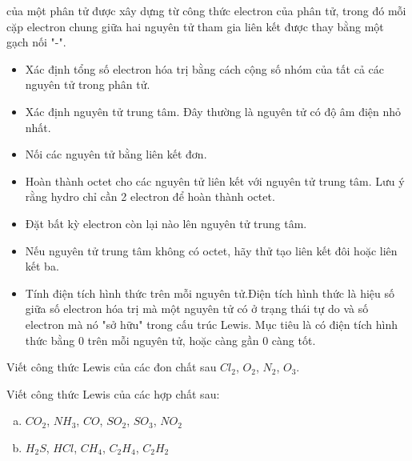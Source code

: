 \documentclass[Main_ver2.tex]{subfiles}
\gdef\key{}
\begin{document}
		\begin{hopdongian}
			 của một phân tử được xây dựng từ công thức electron của phân tử, trong đó mỗi cặp electron chung giữa hai nguyên tử tham gia liên kết được thay bằng một gạch nối "-".
		\end{hopdongian}
	\begin{phuongphap}
		\begin{itemize}
				\item  {} Xác định tổng số electron hóa trị bằng cách cộng số nhóm của tất cả các nguyên tử trong phân tử.
				\item  {} Xác định nguyên tử trung tâm. Đây thường là nguyên tử có độ âm điện nhỏ nhất.
				\item  {} Nối các nguyên tử bằng liên kết đơn.
				\item  {} Hoàn thành octet cho các nguyên tử liên kết với nguyên tử trung tâm. Lưu ý rằng hydro chỉ cần 2 electron để hoàn thành octet.
				\item  {} Đặt bất kỳ electron còn lại nào lên nguyên tử trung tâm.
				\item  {} Nếu nguyên tử trung tâm không có octet, hãy thử tạo liên kết đôi hoặc liên kết ba.
				\item  {} Tính điện tích hình thức trên mỗi nguyên tử.Điện tích hình thức là hiệu số giữa số electron hóa trị mà một nguyên tử có ở trạng thái tự do và số electron mà nó "sở hữu" trong cấu trúc Lewis. Mục tiêu là có điện tích hình thức bằng 0 trên mỗi nguyên tử, hoặc càng gần 0 càng tốt.
		\end{itemize}
	\end{phuongphap}
	\gdef\key{Lời giải:}
	\begin{vd}
		Viết công thức Lewis của các đon chất sau $Cl_2$, $O_2$, $N_2$, $O_3$.
		\loigiai{}
	\end{vd}
	\hienthiloigiai
	\begin{vd}
		Viết công thức Lewis của các hợp chất sau:
		\begin{enumerate}[a)]
			\item $CO_2$, $NH_3$, $CO$, $SO_2$, $SO_3$, $NO_2$
			\item $H_2S$, $HCl$, $CH_4$, $C_2H_4$, $C_2H_2$
		\end{enumerate}
	\end{vd}
\end{document}
